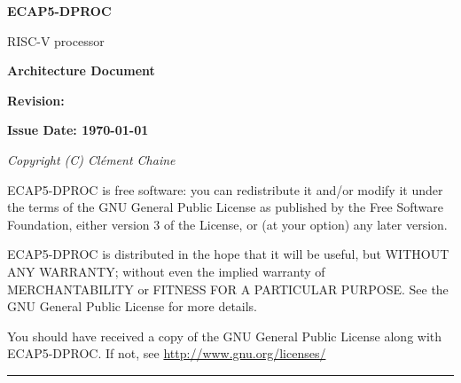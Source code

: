 \begin{titlepage}

\large{\textbf{ECAP5-DPROC}}

\vspace{-0.5em}

\normalsize{RISC-V processor}

\vspace{1.5em}

\Huge{\textbf{Architecture Document}}

\normalsize{\textbf{Revision: \version}}

\normalsize{\textbf{Issue Date: \today}}

\vspace*{\fill}

{\scriptsize \parindent0pt \itshape
Copyright (C) Clément Chaine

ECAP5-DPROC is free software: you can redistribute it and/or modify it under the terms of the GNU General Public License as published by the Free Software Foundation, either version 3 of the License, or (at your option) any later version.

ECAP5-DPROC is distributed in the hope that it will be useful, but WITHOUT ANY WARRANTY; without even the implied warranty of MERCHANTABILITY or FITNESS FOR A PARTICULAR PURPOSE. See the GNU General Public License for more details.

\vspace{-0.5em}

You should have received a copy of the GNU General Public License along with ECAP5-DPROC. If not, see \textnormal{\url{http://www.gnu.org/licenses/}}}

\vspace{1em}

\par\noindent\rule{\textwidth}{1pt}

\end{titlepage}

\newpage
